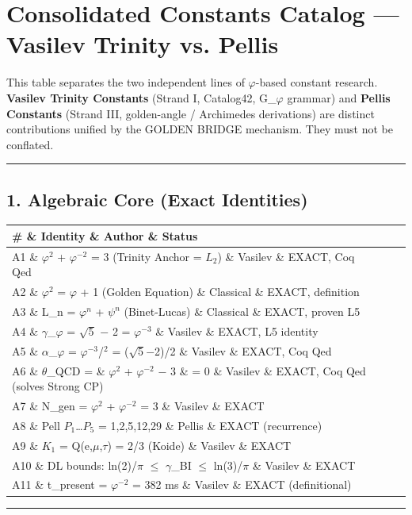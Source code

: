 
\section{Consolidated Constants Catalog --- Vasilev Trinity vs. Pellis}

This table separates the two independent lines of $\varphi$-based constant research. \textbf{Vasilev Trinity Constants} (Strand I, Catalog42, G\_$\varphi$ grammar) and \textbf{Pellis Constants} (Strand III, golden-angle / Archimedes derivations) are distinct contributions unified by the GOLDEN BRIDGE mechanism. They must not be conflated.

\noindent\rule{\textwidth}{0.4pt}

\subsection{1. Algebraic Core (Exact Identities)}

\begin{tabular}{|l|l|l|l|}
\hline
\# \& Identity \& Author \& Status \\
\hline
A1 \& $\varphi^{2}$ + $\varphi^{-2}$ = 3 (Trinity Anchor = $L_{2}$) \& Vasilev \& EXACT, Coq Qed \\
A2 \& $\varphi^{2}$ = $\varphi$ + 1 (Golden Equation) \& Classical \& EXACT, definition \\
A3 \& L\_n = $\varphi^{n}$ + $\psi^{n}$ (Binet-Lucas) \& Classical \& EXACT, proven L5 \\
A4 \& $\gamma$\_$\varphi$ = $\sqrt{5}$ $-$ 2 = $\varphi^{-3}$ \& Vasilev \& EXACT, L5 identity \\
A5 \& $\alpha$\_$\varphi$ = $\varphi^{-3}$/$^{2}$ = ($\sqrt{5}$$-$2)/2 \& Vasilev \& EXACT, Coq Qed \\
A6 \& $\theta$\_QCD = \& $\varphi^{2}$ + $\varphi^{-2}$ $-$ 3 \& = 0 \& Vasilev \& EXACT, Coq Qed (solves Strong CP) \\
A7 \& N\_gen = $\varphi^{2}$ + $\varphi^{-2}$ = 3 \& Vasilev \& EXACT \\
A8 \& Pell $P_{1}$…$P_{5}$ = 1,2,5,12,29 \& Pellis \& EXACT (recurrence) \\
A9 \& $K_{1}$ = Q(e,$\mu$,$\tau$) = 2/3 (Koide) \& Vasilev \& EXACT \\
A10 \& DL bounds: ln(2)/$\pi$ $\leq$ $\gamma$\_BI $\leq$ ln(3)/$\pi$ \& Vasilev \& EXACT \\
A11 \& t\_present = $\varphi^{-2}$ = 382 ms \& Vasilev \& EXACT (definitional) \\
\hline
\end{tabular}
\noindent\rule{\textwidth}{0.4pt}

